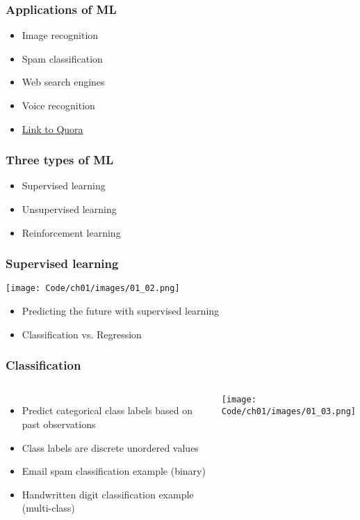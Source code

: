\documentclass{beamer}
\begin{document}
\begin{frame}
  \frametitle{Applications of ML}
  \begin{itemize}
  \item Image recognition
  \item Spam classification
  \item Web search engines
  \item Voice recognition
  \item \href{https://www.quora.com/What-are-some-real-world-examples-of-applications-of-machine-learning-in-the-field}{Link to Quora}
  \end{itemize}
\end{frame}

\begin{frame}
  \frametitle{Three types of ML}
  \begin{itemize}
  \item Supervised learning
  \item Unsupervised learning
  \item Reinforcement learning
  \end{itemize}
\end{frame}

\begin{frame}
  \frametitle{Supervised learning}
  \texttt{[image: Code/ch01/images/01\_02.png]}
  \begin{itemize}
  \item Predicting the future with supervised learning
  \item Classification vs. Regression
  \end{itemize}
\end{frame}

\begin{frame}
  \frametitle{Classification}
  \begin{columns}[c]
    \begin{itemize}
    \item Predict categorical class labels based on past observations
    \item Class labels are discrete unordered values
    \item Email spam classification example (binary)
    \item Handwritten digit classification example (multi-class)
    \end{itemize}
    \texttt{[image: Code/ch01/images/01\_03.png]}
  \end{columns}
\end{frame}
\end{document}
